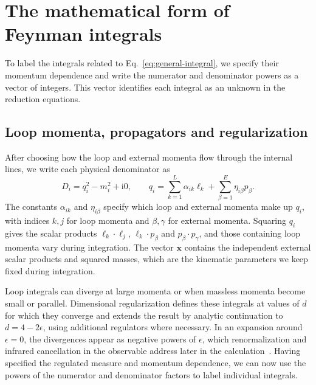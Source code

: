 \section{The mathematical form of Feynman integrals}
\label{sec:integral-form}
To label the integrals related to Eq.~\eqref{eq:general-integral}, we
specify their momentum dependence and write the numerator and denominator
powers as a vector of integers. This vector identifies each integral as
an unknown in the reduction equations.

\subsection{Loop momenta, propagators and regularization}
After choosing how the loop and external momenta flow through the internal
lines, we write each physical denominator as
\begin{equation}
 D_i=q_i^2-m_i^2+\mathrm{i}0,
 \qquad
 q_i=\sum_{k=1}^{L}\alpha_{ik}\ell_k
       +\sum_{\beta=1}^{E}\eta_{i\beta}p_\beta .
 \label{eq:propagator}
\end{equation}
The constants $\alpha_{ik}$ and $\eta_{i\beta}$ specify which loop and
external momenta make up $q_i$, with indices $k,j$ for loop momenta and
$\beta,\gamma$ for external momenta. Squaring $q_i$ gives the scalar
products $\ell_k\cdot\ell_j$, $\ell_k\cdot p_\beta$ and
$p_\beta\cdot p_\gamma$, and those containing loop momenta vary during
integration. The vector $\boldsymbol x$ contains the independent external
scalar products and squared masses, which are the kinematic parameters
we keep fixed during integration.

Loop integrals can diverge at large momenta or when massless momenta become
small or parallel. Dimensional regularization defines these integrals at
values of $d$ for which they converge and extends the result by analytic
continuation to $d=4-2\epsilon$, using additional regulators where
necessary. In an expansion around $\epsilon=0$, the divergences appear
as negative powers of $\epsilon$, which
renormalization and infrared cancellation in the observable address later
in the calculation~\cite{Weinzierl2010}. Having specified the regulated
measure and momentum dependence, we can now use the powers of the
numerator and denominator factors to label individual integrals.

